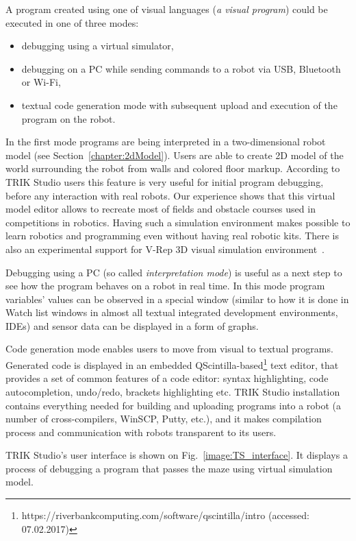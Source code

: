 \documentclass[conference]{IEEEtran}
\begin{document}
A program created using one of visual languages (\textit{a visual program}) could be executed in one of three modes:
\begin{itemize}
    \item debugging using a virtual simulator,
    \item debugging on a PC while sending commands to a robot via USB, Bluetooth or Wi-Fi,
    \item textual code generation mode with subsequent upload and execution of the program on the robot.
\end{itemize}

In the first mode programs are being interpreted in a two-dimensional robot model (see Section~\ref{chapter:2dModel}). Users are able to create 2D model of the world surrounding the robot from walls and colored floor markup. According to TRIK Studio users this feature is very useful for initial program debugging, before any interaction with real robots. Our experience shows that this virtual model editor allows to recreate most of fields and obstacle courses used in competitions in robotics. Having such a simulation environment makes possible to learn robotics and programming even without having real robotic kits. There is also an experimental support for V-Rep 3D visual simulation environment~\cite{rohmer2013v}.

Debugging using a PC (so called \textit{interpretation mode}) is useful as a next step to see how the program behaves on a robot in real time. In this mode program variables' values can be observed in a special window (similar to how it is done in Watch list windows in almost all textual integrated development environments, IDEs) and sensor data can be displayed in a form of graphs. 

Code generation mode enables users to move from visual to textual programs. Generated code is displayed in an embedded QScintilla-based\footnote{https://riverbankcomputing.com/software/qscintilla/intro (accessed: 07.02.2017)} text editor, that provides a set of common features of a code editor: syntax highlighting, code autocompletion, undo/redo, brackets highlighting etc. TRIK Studio installation contains everything needed for building and uploading programs into a robot (a number of cross-compilers, WinSCP, Putty, etc.), and it makes compilation process and communication with robots transparent to its users.

TRIK Studio's user interface is shown on Fig.~\ref{image:TS_interface}. It displays a process of debugging a program that passes the maze using virtual simulation model.
\end{document}
